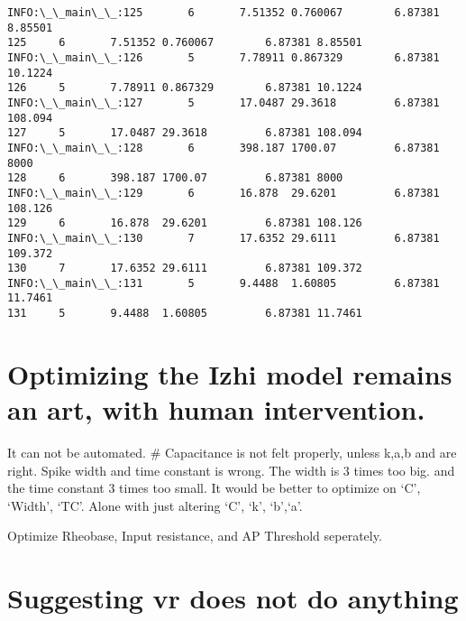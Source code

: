 \documentclass[11pt]{article}
\begin{document}
\begin{Verbatim}[commandchars=\\\{\}]
INFO:\_\_main\_\_:125       6       7.51352 0.760067        6.87381 8.85501
125     6       7.51352 0.760067        6.87381 8.85501
INFO:\_\_main\_\_:126       5       7.78911 0.867329        6.87381 10.1224
126     5       7.78911 0.867329        6.87381 10.1224
INFO:\_\_main\_\_:127       5       17.0487 29.3618         6.87381 108.094
127     5       17.0487 29.3618         6.87381 108.094
INFO:\_\_main\_\_:128       6       398.187 1700.07         6.87381 8000
128     6       398.187 1700.07         6.87381 8000
INFO:\_\_main\_\_:129       6       16.878  29.6201         6.87381 108.126
129     6       16.878  29.6201         6.87381 108.126
INFO:\_\_main\_\_:130       7       17.6352 29.6111         6.87381 109.372
130     7       17.6352 29.6111         6.87381 109.372
INFO:\_\_main\_\_:131       5       9.4488  1.60805         6.87381 11.7461
131     5       9.4488  1.60805         6.87381 11.7461
    \end{Verbatim}

    \hypertarget{optimizing-the-izhi-model-remains-an-art-with-human-intervention.}{%
\section{Optimizing the Izhi model remains an art, with human
intervention.}\label{optimizing-the-izhi-model-remains-an-art-with-human-intervention.}}

It can not be automated. \# Capacitance is not felt properly, unless
k,a,b and are right. Spike width and time constant is wrong. The width
is 3 times too big. and the time constant 3 times too small. It would be
better to optimize on `C', `Width', `TC'. Alone with just altering `C',
`k', `b',`a'.

Optimize Rheobase, Input resistance, and AP Threshold seperately.

    \hypertarget{suggesting-vr-does-not-do-anything}{%
\section{Suggesting vr does not do
anything}\label{suggesting-vr-does-not-do-anything}}


    
    
    
\end{document}
